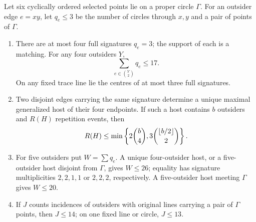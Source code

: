 \begin{lemma}
\label{lem:six-conic-events}
Let six cyclically ordered selected points lie on a proper circle $\Gamma$.
For an outsider edge $e=xy$, let $q_e\le3$ be the number of circles through
$x,y$ and a pair of points of $\Gamma$.
\begin{enumerate}[label=\textup{(S\arabic*)}]
\item There are at most four full signatures $q_e=3$; the support of each
is a matching.  For any four outsiders $Y$,
\begin{equation}\label{eq:U17}
 \sum_{e\in\binom Y2}q_e\le17.
\end{equation}
On any fixed trace line lie the centres of at most three full signatures.
\item Two disjoint edges carrying the same signature determine a unique
maximal generalized host of their four endpoints.  If such a host contains
$b$ outsiders and $R(H)$ repetition events, then
\begin{equation}\label{eq:conic-event-cap}
 R(H)\le \min\left\{2\binom b4,
 3\binom{\left\lfloor b/2\right\rfloor}2\right\}.
\end{equation}
\item For five outsiders put $W=\sum q_e$.  A unique four-outsider host, or
a five-outsider host disjoint from $\Gamma$, gives $W\le26$; equality has
signature multiplicities $2,2,1,1$ or $2,2,2$, respectively.  A
five-outsider host meeting $\Gamma$ gives $W\le20$.
\item If $J$ counts incidences of outsiders with original lines carrying a
pair of $\Gamma$ points, then $J\le14$; on one fixed line or circle,
$J\le13$.
\end{enumerate}
\end{lemma}

